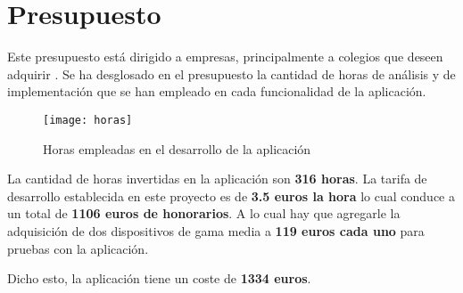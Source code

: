 %
%
%
%

\cleardoublepage
\chapter{Presupuesto}
\label{chap:budget}

	Este presupuesto está dirigido a empresas, principalmente a colegios que deseen adquirir \CollegeApp. Se ha desglosado en el presupuesto la cantidad de horas de análisis y de implementación que se han empleado en cada funcionalidad de la aplicación.
		
		\begin{figure}[h !]
			\centering
			\texttt{[image: horas]}
			\caption{Horas empleadas en el desarrollo de la aplicación}
			\label{fig:presupuesto}
		\end{figure}
		
		La cantidad de horas invertidas en la aplicación son {\bf 316 horas}. La tarifa de desarrollo establecida en este proyecto es de {\bf 3.5 euros la hora} lo cual conduce a un total de {\bf 1106 euros de honorarios}. A lo cual hay que agregarle la adquisición de dos dispositivos de gama media a {\bf 119 euros cada uno} para pruebas con la aplicación.
		
		\bigskip
		Dicho esto, la aplicación tiene un coste de {\bf \large 1334 euros}.